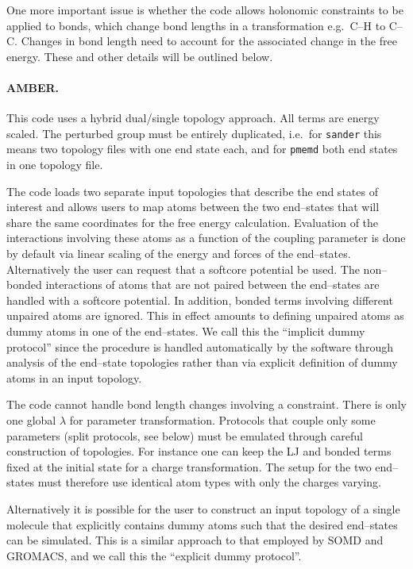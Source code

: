 \documentclass[journal=jctcce,manuscript=article]{achemso}
\newcommand{\progname}[1]{\texttt{#1}}
\begin{document}
One more important issue is whether the code allows holonomic constraints to be applied
to bonds, which change bond lengths in a transformation e.g.\ C--H to C--C.
Changes in bond length need to account for the associated change in the free
energy.  These and other details will be outlined below.

\paragraph{AMBER.}
This code uses a hybrid dual/single topology approach.  All terms are energy scaled.
The perturbed group must be entirely duplicated, i.e.\ for
\progname{sander} this means two topology files with one end state each, and for \progname{pmemd} both end states in one topology file.

The code loads two separate input topologies that describe the end
states of interest and allows users to map atoms between the two
end--states that will share the same coordinates for the free energy
calculation.  Evaluation of the interactions involving these atoms as
a function of the coupling parameter is done by default via linear
scaling of the energy and forces of the end--states.  Alternatively
the user can request that a softcore potential be used.  The
non--bonded interactions of atoms that are not paired between the
end--states are handled with a softcore potential.  In addition,
bonded terms involving different unpaired atoms are ignored.  This in
effect amounts to defining unpaired atoms as dummy atoms in one of the
end--states.  We call this the ``implicit dummy protocol'' since the
procedure is handled automatically by the software through analysis of
the end--state topologies rather than via explicit definition of dummy
atoms in an input topology.

The code cannot handle bond length changes involving a constraint.
There is only one global $\lambda$ for parameter transformation.
Protocols that couple only some parameters (split protocols, see
below) must be emulated through careful construction of topologies.  For instance one can keep the LJ and bonded terms fixed at the initial state for a charge transformation.  The setup for
the two end--states must therefore use identical atom types with only the charges varying.

Alternatively it is possible for the user to construct an input
topology of a single molecule that explicitly contains dummy atoms
such that the desired end--states can be simulated.  This is a similar approach to that employed by SOMD and GROMACS, and we call this the ``explicit dummy protocol''.
\end{document}
